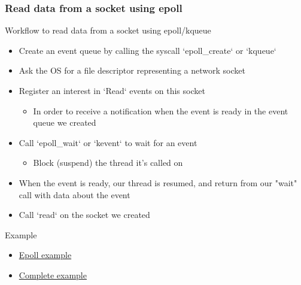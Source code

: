 \begin{frame}[fragile]
    \frametitle{Read data from a socket using epoll}
% 
% 
{\color{red}Workflow to read data from a socket using epoll/kqueue}
% 
    \begin{itemize}
        \item Create an event queue by calling the syscall `epoll\_create` or `kqueue`
        \item Ask the OS for a file descriptor representing a network socket
        \item Register an interest in `Read` events on this socket
    	\begin{itemize}
    	    \item In order to receive a notification when the event is ready in the event queue we created
    	\end{itemize}
        \item Call `epoll\_wait` or `kevent` to wait for an event
    	\begin{itemize}
    	    \item Block (suspend) the thread it's called on
    	\end{itemize}
        \item When the event is ready, our thread is resumed, and return from our "wait" call with data about the event
        \item Call `read` on the socket we created
    \end{itemize}
% 
{\color{red}Example}
% 
    \begin{itemize}
        \item \href{http://man7.org/linux/man-pages/man7/epoll.7.html}{Epoll example}
        \item \href{https://www.suchprogramming.com/epoll-in-3-easy-steps/}{Complete example}
    \end{itemize}

\end{frame}

